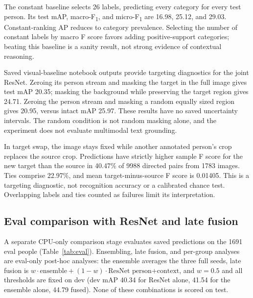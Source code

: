 \documentclass[conference]{IEEEtran}
\newcommand{\ev}[2]{#2}
\newcommand{\mf}{macro-F\textsubscript{1}}
\newcommand{\mi}{micro-F\textsubscript{1}}
\begin{document}
The constant baseline selects \ev{constant-k}{26} labels, predicting every category for every test person. Its test mAP, \mf{}, and \mi{} are \ev{constant-test-map}{16.98}, \ev{constant-test-macro_f1}{25.12}, and \ev{constant-test-micro_f1}{29.03}. Constant-ranking AP reduces to category prevalence. Selecting the number of constant labels by macro F score favors adding positive-support categories; beating this baseline is a sanity result, not strong evidence of contextual reasoning.

Saved visual-baseline notebook outputs provide targeting diagnostics for the joint ResNet. Zeroing its person stream and masking the target in the full image gives test mAP \ev{region-delta_person-map}{20.35}; masking the background while preserving the target region gives \ev{region-delta_context-map}{24.71}. Zeroing the person stream and masking a random equally sized region gives \ev{region-delta_random-map}{20.95}, versus intact mAP \ev{resnet-person_context-test-map}{25.97}. These results have no saved uncertainty intervals. The random condition is not random masking alone, and the experiment does not evaluate multimodal text grounding.

In target swap, the image stays fixed while another annotated person's crop replaces the source crop. Predictions have strictly higher sample F score for the new target than the source in \ev{swap-swap_accuracy}{40.47}\% of \ev{swap-num_pairs}{9988} directed pairs from \ev{swap-num_images}{1783} images. Ties comprise \ev{swap-tie_rate}{22.97}\%, and mean target-minus-source F score is \ev{swap-mean_target_minus_source_f1}{0.01405}. This is a targeting diagnostic, not recognition accuracy or a calibrated chance test. Overlapping labels and ties counted as failures limit its interpretation.

\subsection{Eval comparison with ResNet and late fusion}\label{sec:eval}
A separate CPU-only comparison stage evaluates saved predictions on the 1691 eval people (Table~\ref{tab:eval}). Ensembling, late fusion, and per-group analyses are eval-only post-hoc analyses: the ensemble averages the three full seeds, late fusion is $w\cdot\text{ensemble}+(1-w)\cdot\text{ResNet person+context}$, and $w=0.5$ and all thresholds are fixed on dev (dev mAP 40.34 for ResNet alone, 41.54 for the ensemble alone, 44.79 fused). None of these combinations is scored on test.
\end{document}
